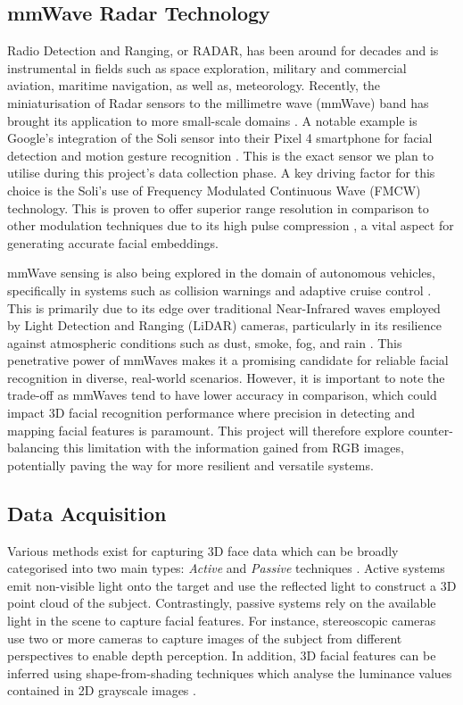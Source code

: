 \documentclass{interim}
\begin{document}
\subsection{mmWave Radar Technology}
Radio Detection and Ranging, or RADAR, has been around for decades and is instrumental in fields such as space exploration, military and commercial aviation, maritime navigation, as well as, meteorology. Recently, the miniaturisation of Radar sensors to the millimetre wave (mmWave) band has brought its application to more small-scale domains \cite{soumya2023recent}. A notable example is Google's integration of the Soli sensor into their Pixel 4 smartphone for facial detection and motion gesture recognition \cite{googleblog2020}. This is the exact sensor we plan to utilise during this project's data collection phase. A key driving factor for this choice is the Soli's use of Frequency Modulated Continuous Wave (FMCW) technology. This is proven to offer superior range resolution in comparison to other modulation techniques due to its high pulse compression \cite{mahafza2005radar}, a vital aspect for generating accurate facial embeddings. 

mmWave sensing is also being explored in the domain of autonomous vehicles, specifically in systems such as collision warnings and adaptive cruise control \cite{dfrobot}. This is primarily due to its edge over traditional Near-Infrared waves employed by Light Detection and Ranging (LiDAR) cameras, particularly in its resilience against atmospheric conditions such as dust, smoke, fog, and rain \cite{cadenceblog2022}. This penetrative power of mmWaves makes it a promising candidate for reliable facial recognition in diverse, real-world scenarios. However, it is important to note the trade-off as mmWaves tend to have lower accuracy in comparison, which could impact 3D facial recognition performance where precision in detecting and mapping facial features is paramount. This project will therefore explore counter-balancing this limitation with the information gained from RGB images, potentially paving the way for more resilient and versatile systems.


\subsection{Data Acquisition}
Various methods exist for capturing 3D face data which can be broadly categorised into two main types: \textit{Active} and \textit{Passive} techniques \cite{zhou20183d}. Active systems emit non-visible light onto the target and use the reflected light to construct a 3D point cloud of the subject. Contrastingly, passive systems rely on the available light in the scene to capture facial features. For instance, stereoscopic cameras use two or more cameras to capture images of the subject from different perspectives to enable depth perception. In addition, 3D facial features can be inferred using shape-from-shading techniques which analyse the luminance values contained in 2D grayscale images \cite{horn1977understanding}.
\end{document}
